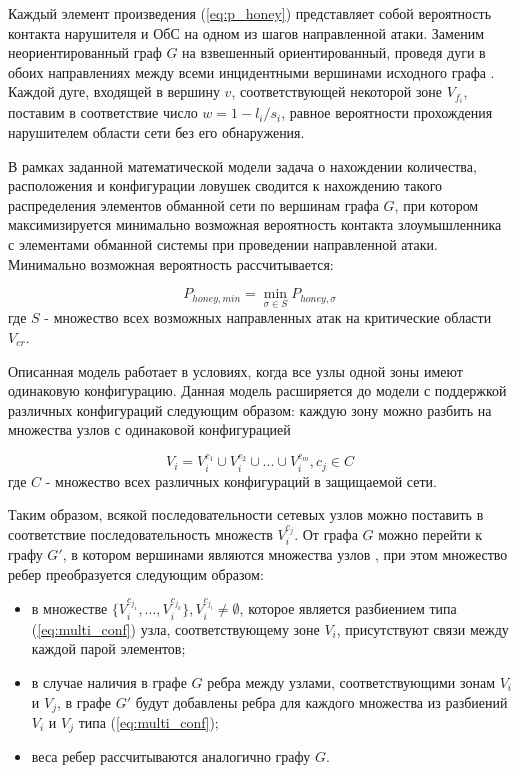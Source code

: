 Каждый элемент произведения (\ref{eq:p_honey}) представляет собой вероятность контакта нарушителя и ОбС на одном из шагов направленной атаки. Заменим неориентированный граф $G$ на взвешенный ориентированный, проведя дуги в обоих направлениях между всеми инцидентными вершинами исходного графа . Каждой дуге, входящей в вершину $v$, соответствующей некоторой зоне $V_{f_i}$, поставим в соответствие число $w = 1 - l_i / s_i$, равное вероятности прохождения нарушителем области сети  без его обнаружения.

В рамках заданной математической модели задача о нахождении количества, расположения и конфигурации ловушек сводится к нахождению такого распределения элементов обманной сети по вершинам графа $G$, при котором максимизируется минимально возможная вероятность контакта злоумышленника с элементами обманной системы при проведении направленной атаки. Минимально возможная вероятность рассчитывается:

\begin{equation}
\label{eq:p_honey_min}
P_{honey, min} = \min_{\sigma \in S} P_{honey, \sigma} 
\end{equation}
где $S$ - множество всех возможных направленных атак на критические области $V_{cr}$.

Описанная модель работает в условиях, когда все узлы одной зоны имеют одинаковую конфигурацию. Данная модель расширяется до модели с поддержкой различных конфигураций следующим образом: каждую зону можно разбить на множества узлов с одинаковой конфигурацией

\begin{equation}
\label{eq:multi_conf}
V_{i} = V_i^{c_1} \cup V_i^{c_2} \cup ... \cup V_i^{c_m}, c_j \in C
\end{equation}
где $C$ - множество всех различных конфигураций в защищаемой сети.

Таким образом, всякой последовательности сетевых узлов можно поставить в соответствие последовательность множеств $V_i^{c_j}$. От графа $G$ можно перейти к графу $G'$, в котором вершинами являются множества узлов , при этом множество ребер преобразуется следующим образом:

\begin{itemize}
	\item в множестве $\{V_i^{c_{j_1}},..., V_i^{c_{j_k}}\}, V_i^{c_{j_l}} \neq \emptyset$, которое является разбиением типа (\ref{eq:multi_conf}) узла, соответствующему зоне $V_i$, присутствуют связи между каждой парой элементов;
	\item в случае наличия в графе $G$ ребра между узлами, соответствующими зонам $V_i$ и $V_j$, в графе $G'$ будут добавлены ребра для каждого множества из разбиений $V_i$ и $V_j$ типа (\ref{eq:multi_conf});
	\item веса ребер рассчитываются аналогично графу $G$.
\end{itemize}

